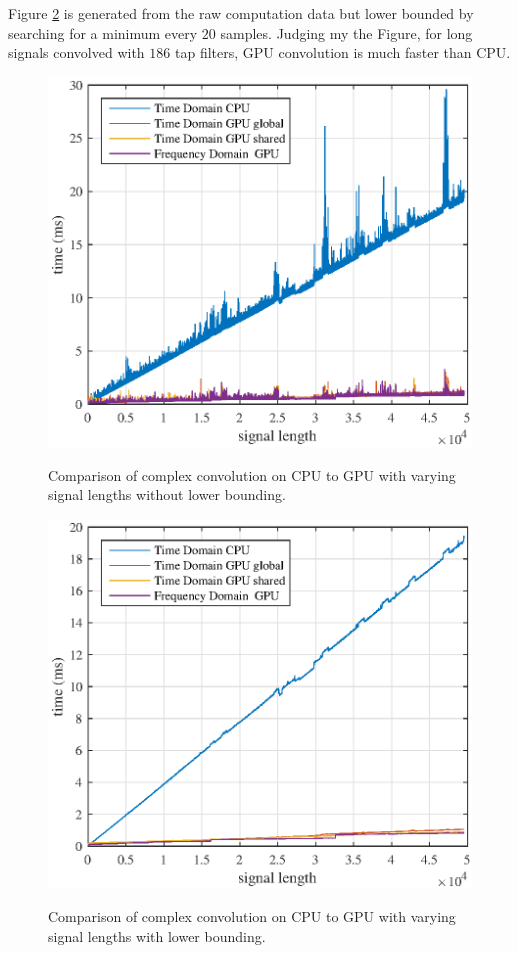 Figure \ref{fig:CPUvsGPU} is generated from the raw computation data but lower bounded by searching for a minimum every $20$ samples.
Judging my the Figure, for long signals convolved with $186$ tap filters, GPU convolution is much faster than CPU.
\begin{figure}
	\caption{Comparison of complex convolution on CPU to GPU with varying signal lengths without lower bounding.}
	\centering\includegraphics[width=5in]{figures/gpu_intro/CPUvsGPU_spikes.eps}
	\label{fig:CPUvsGPU_spikes}
\end{figure}
\begin{figure}
	\caption{Comparison of complex convolution on CPU to GPU with varying signal lengths with lower bounding.}
	\centering\includegraphics[width=5in]{figures/gpu_intro/CPUvsGPU.eps}
	\label{fig:CPUvsGPU}
\end{figure}


